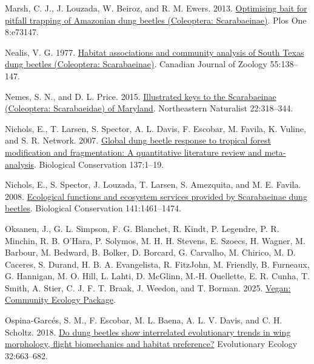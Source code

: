 \documentclass[
  man, donotrepeattitle]{apa6}
\newlength{\cslhangindent}
\newenvironment{CSLReferences}[2] %
 {\begin{list}{}{%
  \setlength{\itemindent}{0pt}
  \setlength{\leftmargin}{0pt}
  \setlength{\parsep}{0pt}
  \ifodd #1
   \setlength{\leftmargin}{\cslhangindent}
   \setlength{\itemindent}{-1\cslhangindent}
  \fi
  \setlength{\itemsep}{#2\baselineskip}}}
 {\end{list}}
\begin{document}
\begin{CSLReferences}{1}{0}
Marsh, C. J., J. Louzada, W. Beiroz, and R. M. Ewers. 2013. \href{https://doi.org/10.1371/journal.pone.0073147}{Optimising bait for pitfall trapping of {Amazonian} dung beetles ({Coleoptera}: {Scarabaeinae})}. Plos One 8:e73147.

Nealis, V. G. 1977. \href{https://doi.org/10.1139/z77-017}{Habitat associations and community analysis of {South} {Texas} dung beetles ({Coleoptera}: {Scarabaeinae})}. Canadian Journal of Zoology 55:138--147.

Nemes, S. N., and D. L. Price. 2015. \href{https://doi.org/10.1656/045.022.0208}{Illustrated keys to the {Scarabaeinae} ({Coleoptera}: {Scarabaeidae}) of {Maryland}}. Northeastern Naturalist 22:318--344.

Nichols, E., T. Larsen, S. Spector, A. L. Davis, F. Escobar, M. Favila, K. Vuline, and S. R. Network. 2007. \href{https://doi.org/10.1016/j.biocon.2007.01.023}{Global dung beetle response to tropical forest modification and fragmentation: {A} quantitative literature review and meta-analysis}. Biological Conservation 137:1--19.

Nichols, E., S. Spector, J. Louzada, T. Larsen, S. Amezquita, and M. E. Favila. 2008. \href{https://doi.org/10.1016/j.biocon.2008.04.011}{Ecological functions and ecosystem services provided by {Scarabaeinae} dung beetles}. Biological Conservation 141:1461--1474.

Oksanen, J., G. L. Simpson, F. G. Blanchet, R. Kindt, P. Legendre, P. R. Minchin, R. B. O'Hara, P. Solymos, M. H. H. Stevens, E. Szoecs, H. Wagner, M. Barbour, M. Bedward, B. Bolker, D. Borcard, G. Carvalho, M. Chirico, M. D. Caceres, S. Durand, H. B. A. Evangelista, R. FitzJohn, M. Friendly, B. Furneaux, G. Hannigan, M. O. Hill, L. Lahti, D. McGlinn, M.-H. Ouellette, E. R. Cunha, T. Smith, A. Stier, C. J. F. T. Braak, J. Weedon, and T. Borman. 2025. \href{https://CRAN.R-project.org/package=vegan}{Vegan: {Community} {Ecology} {Package}}.

Ospina-Garcés, S. M., F. Escobar, M. L. Baena, A. L. V. Davis, and C. H. Scholtz. 2018. \href{https://doi.org/10.1007/s10682-018-9958-z}{Do dung beetles show interrelated evolutionary trends in wing morphology, flight biomechanics and habitat preference?} Evolutionary Ecology 32:663--682.


\end{CSLReferences}
\end{document}
